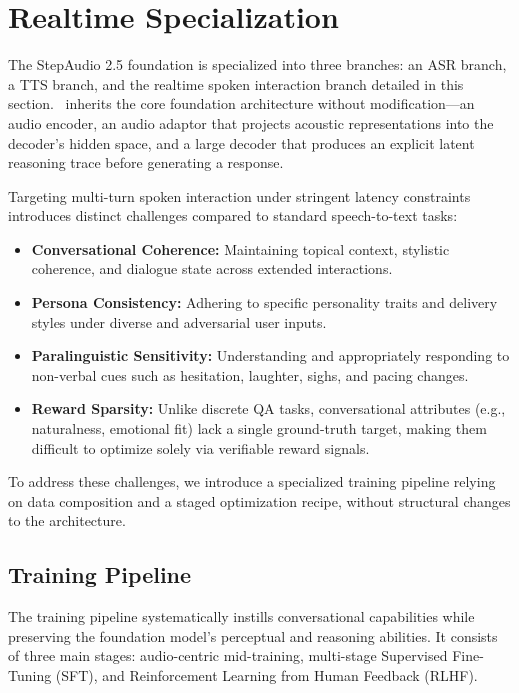 \section{Realtime Specialization}
\label{sec:realtime}

The StepAudio 2.5 foundation is specialized into three branches: an ASR branch, a TTS branch, and the realtime spoken interaction branch detailed in this section. \steprealtime\ inherits the core foundation architecture without modification---an audio encoder, an audio adaptor that projects acoustic representations into the decoder's hidden space, and a large decoder that produces an explicit latent reasoning trace before generating a response.

Targeting multi-turn spoken interaction under stringent latency constraints introduces distinct challenges compared to standard speech-to-text tasks:
\begin{itemize}
    \item \textbf{Conversational Coherence:} Maintaining topical context, stylistic coherence, and dialogue state across extended interactions.
    \item \textbf{Persona Consistency:} Adhering to specific personality traits and delivery styles under diverse and adversarial user inputs.
    \item \textbf{Paralinguistic Sensitivity:} Understanding and appropriately responding to non-verbal cues such as hesitation, laughter, sighs, and pacing changes.
    \item \textbf{Reward Sparsity:} Unlike discrete QA tasks, conversational attributes (e.g., naturalness, emotional fit) lack a single ground-truth target, making them difficult to optimize solely via verifiable reward signals.
\end{itemize}
To address these challenges, we introduce a specialized training pipeline relying on data composition and a staged optimization recipe, without structural changes to the architecture.

\subsection{Training Pipeline}
The training pipeline systematically instills conversational capabilities while preserving the foundation model's perceptual and reasoning abilities. It consists of three main stages: audio-centric mid-training, multi-stage Supervised Fine-Tuning (SFT), and Reinforcement Learning from Human Feedback (RLHF).

